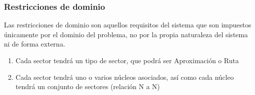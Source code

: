 \subsubsection{Restricciones de dominio}
Las restricciones de dominio son aquellos requisitos del sistema que son impuestos únicamente por el dominio del problema, no por la propia naturaleza del sistema ni de forma externa.

\begin{enumerate}[label={\textbf{RD\arabic*}}]
	\item \label{RD-tipos-sector}  Cada sector tendrá un tipo de sector, que podrá ser Aproximación o Ruta
	\item  \label{RD-sector-nucleo} Cada sector tendrá uno o varios núcleos asociados, así como cada núcleo tendrá un conjunto de sectores (relación N a N)
	
\end{enumerate}